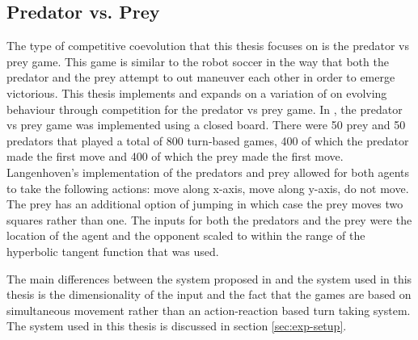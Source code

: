 \subsection{Predator vs. Prey}
The type of competitive coevolution that this thesis focuses on is the predator vs prey game. This game is similar to the robot soccer in the way that both the predator and the prey attempt to out maneuver each other in order to emerge victorious. This thesis implements and expands on a variation of \cite{Langenhoven-2006} on evolving behaviour through competition for the predator vs prey game. In \cite{Langenhoven-2006}, the predator vs prey game was implemented using a closed board. There were 50 prey and 50 predators that played a total of 800 turn-based games, 400 of which the predator made the first move and 400 of which the prey made the first move. Langenhoven's implementation of the predators and prey allowed for both agents to take the following actions: move along x-axis, move along y-axis, do not move. The prey has an additional option of jumping in which case the prey moves two squares rather than one. The inputs for both the predators and the prey were the location of the agent and the opponent scaled to within the range of the hyperbolic tangent function that was used. 

The main differences between the system proposed in \cite{Langenhoven-2006} and the system used in this thesis is the dimensionality of the input and the fact that the games are based on simultaneous movement rather than an action-reaction based turn taking system. 
The system used in this thesis is discussed in section \ref{sec:exp-setup}.